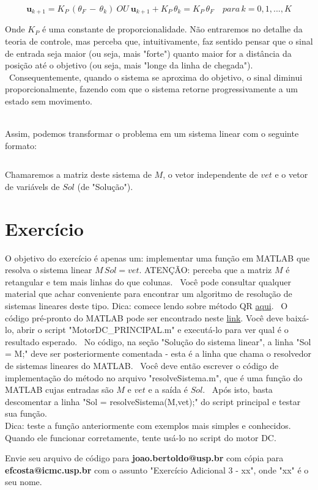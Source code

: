 \documentclass[12pt,a4paper,english,brazil]{article}
\begin{document}
\begin{equation}\label{eqn:ctrlP}
    \pmb{u}_{k+1} = K_P \, (\theta_F \, - \, \theta_k) 
	\
	OU 
	\
	\pmb{u}_{k+1} + K_P \, \theta_k = K_P \, \theta_F 
    \quad para \, k = 0, 1, ..., K
\end{equation}

Onde $K_P$ é uma constante de proporcionalidade. Não entraremos no detalhe da teoria de controle, mas perceba que, intuitivamente, faz sentido pensar que o sinal de entrada seja maior (ou seja, mais "forte") quanto maior for a distância da posição até o objetivo (ou seja, mais "longe da linha de chegada").
\
Consequentemente, quando o sistema se aproxima do objetivo, o sinal diminui proporcionalmente, fazendo com que o sistema retorne progressivamente a um estado sem movimento.

\\

Assim, podemos transformar o problema em um sistema linear com o seguinte formato:

\begin{equation} \label{eqn:syslin}
\end{equation}

Chamaremos a matriz deste sistema de $M$, o vetor independente de $vet$ e o vetor de variávels de $Sol$ (de "Solução").

\section{Exercício} \label{sec-exer}

O objetivo do exercício é apenas um: implementar uma função em MATLAB que resolva o sistema linear $M \, Sol = vet$. ATENÇÃO: perceba que a matriz $M$ é retangular e tem mais linhas do que colunas.
\
Você pode consultar qualquer material que achar conveniente para encontrar um algoritmo de resolução de sistemas lineares deste tipo. Dica: comece lendo sobre método QR \href{}{aqui}.
\
O código pré-pronto do MATLAB pode ser encontrado neste \href{}{link}. Você deve baixá-lo, abrir o script "MotorDC_PRINCIPAL.m" e executá-lo para ver qual é o resultado esperado.
\
No código, na seção "Solução do sistema linear", a linha "Sol = M\vet;" deve ser posteriormente comentada - esta é a linha que chama o resolvedor de sistemas lineares do MATLAB.
\
Você deve então escrever o código de implementação do método no arquivo "resolveSistema.m", que é uma função do MATLAB cujas entradas são $M$ e $vet$ e a saída é $Sol$.
\
Após isto, basta descomentar a linha "Sol = resolveSistema(M,vet);" do script principal e testar sua função.
\\
Dica: teste a função anteriormente com exemplos mais simples e conhecidos. Quando ele funcionar corretamente, tente usá-lo no script do motor DC.

\bigskip

Envie seu arquivo de código para \textbf{joao.bertoldo@usp.br} com cópia para \textbf{efcosta@icmc.usp.br} com o assunto "Exercício Adicional 3 - xx", onde "xx" é o seu nome.

\bigskip

\centering{\Large{Boa sorte!}}
\end{document}

